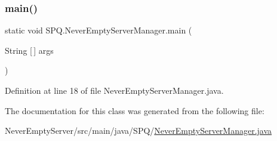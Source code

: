 \subsubsection{\texorpdfstring{main()}{main()}}
{\footnotesize\ttfamily static void S\+P\+Q.\+Never\+Empty\+Server\+Manager.\+main (\begin{DoxyParamCaption}\item[{String \mbox{[}$\,$\mbox{]}}]{args }\end{DoxyParamCaption})\hspace{0.3cm}{\ttfamily [static]}}



Definition at line 18 of file Never\+Empty\+Server\+Manager.\+java.



The documentation for this class was generated from the following file\+:\begin{DoxyCompactItemize}
\item 
Never\+Empty\+Server/src/main/java/\+S\+P\+Q/\mbox{\hyperlink{_never_empty_server_manager_8java}{Never\+Empty\+Server\+Manager.\+java}}\end{DoxyCompactItemize}
